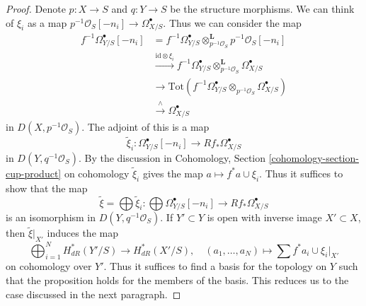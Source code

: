 \begin{proof}
Denote $p : X \to S$ and $q : Y \to S$ be the structure morphisms.
We can think of
$\xi_i$ as a map $p^{-1}\mathcal{O}_S[-n_i] \to \Omega^\bullet_{X/S}$.
Thus we can consider the map
\begin{align*}
f^{-1}\Omega^\bullet_{Y/S}[-n_i]
& =
f^{-1}\Omega^\bullet_{Y/S} \otimes_{p^{-1}\mathcal{O}_S}^\mathbf{L}
p^{-1}\mathcal{O}_S[-n_i] \\
& \xrightarrow{\text{id} \otimes \xi_i}
f^{-1}\Omega^\bullet_{Y/S} \otimes_{p^{-1}\mathcal{O}_S}^\mathbf{L}
\Omega^\bullet_{X/S} \\
& \to
\text{Tot}(f^{-1}\Omega^\bullet_{Y/S} \otimes_{p^{-1}\mathcal{O}_S}
\Omega^\bullet_{X/S}) \\
& \xrightarrow{\wedge}
\Omega^\bullet_{X/S}
\end{align*}
in $D(X, p^{-1}\mathcal{O}_S)$. The adjoint of this is a map
$$
\tilde \xi_i :
\Omega_{Y/S}^\bullet[-n_i]
\longrightarrow
Rf_*\Omega^\bullet_{X/S}
$$
in $D(Y, q^{-1}\mathcal{O}_S)$. By the discussion in
Cohomology, Section \ref{cohomology-section-cup-product}
on cohomology $\tilde \xi_i$ gives the map $a \mapsto f^*a \cup \xi_i$.
Thus it suffices to show that the map
$$
\tilde \xi = \bigoplus \tilde \xi_i :
\bigoplus \Omega^\bullet_{Y/S}[-n_i]
\longrightarrow
Rf_*\Omega^\bullet_{X/S}
$$
is an isomorphism in $D(Y, q^{-1}\mathcal{O}_S)$. If $Y' \subset Y$
is open with inverse image $X' \subset X$, then $\tilde \xi|_{X'}$
induces the map
$$
\bigoplus\nolimits_{i = 1}^N H^*_{dR}(Y'/S) \longrightarrow
H^*_{dR}(X'/S), \quad
(a_1, \ldots, a_N) \longmapsto  \sum f^*a_i \cup \xi_i|_{X'}
$$
on cohomology over $Y'$. Thus it suffices to find a basis for the topology
on $Y$ such that the proposition holds for the members of the basis.
This reduces us to the case discussed in the next paragraph.


\end{proof}

